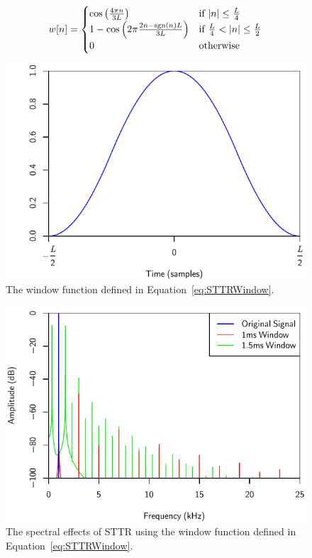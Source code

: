 			\begin{equation}
				w[n] = \begin{cases}
					\cos \left( \frac{4\pi n}{3L} \right) & \text{if $\left|n\right| \leq \frac{L}{4} $} \\
					1 - \cos \left( 2\pi \frac{2n - \operatorname{sgn}(n)L}{3L} \right) &
						\text{if $\frac{L}{4} < \left|n\right| \leq \frac{L}{2}$} \\
					0 & \text{otherwise}
				\end{cases}
				\label{eq:STTRWindow}
			\end{equation}

			\begin{figure}[h!]
				\centering
				\includegraphics{chapter5/Images/STTRWindow.pdf}
				\caption{The window function defined in Equation~\ref{eq:STTRWindow}.}
				\label{fig:STTRWindow}
			\end{figure}

			\begin{figure}[h!]
				\centering
				\includegraphics{chapter5/Images/STTRSpectra.pdf}
				\caption{The spectral effects of STTR using the window function defined in
					 Equation~\ref{eq:STTRWindow}.}
				\label{fig:STTRSpectra}
			\end{figure}

